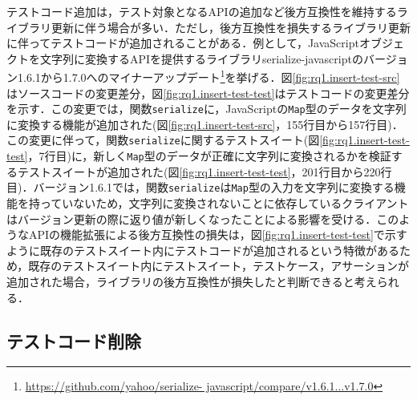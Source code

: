 \documentclass[11pt,dvipdfmx]{jreport}
\begin{document}
テストコード追加は，テスト対象となるAPIの追加など後方互換性を維持するライブラリ更新に伴う場合が多い．ただし，後方互換性を損失するライブラリ更新に伴ってテストコードが追加されることがある．例として，JavaScriptオブジェクトを文字列に変換するAPIを提供するライブラリserialize-javascriptのバージョン1.6.1から1.7.0へのマイナーアップデート\footnote{\url{https://github.com/yahoo/serialize- javascript/compare/v1.6.1...v1.7.0}}を挙げる．図\ref{fig:rq1.insert-test-src}はソースコードの変更差分，図\ref{fig:rq1.insert-test-test}はテストコードの変更差分を示す．この変更では，関数{\verb|serialize|}に，JavaScriptの{\verb|Map|}型のデータを文字列に変換する機能が追加された(図\ref{fig:rq1.insert-test-src}，155行目から157行目)．この変更に伴って，関数{\verb|serialize|}に関するテストスイート(図\ref{fig:rq1.insert-test-test}，7行目)に，新しく{\verb|Map|}型のデータが正確に文字列に変換されるかを検証するテストスイートが追加された(図\ref{fig:rq1.insert-test-test}，201行目から220行目)．バージョン1.6.1では，関数{\verb|serialize|}は{\verb|Map|}型の入力を文字列に変換する機能を持っていないため，文字列に変換されないことに依存しているクライアントはバージョン更新の際に返り値が新しくなったことによる影響を受ける．このようなAPIの機能拡張による後方互換性の損失は，図\ref{fig:rq1.insert-test-test}で示すように既存のテストスイート内にテストコードが追加されるという特徴があるため，既存のテストスイート内にテストスイート，テストケース，アサーションが追加された場合，ライブラリの後方互換性が損失したと判断できると考えられる．

\subsection{テストコード削除}\label{subsec:delete-test}
\end{document}
